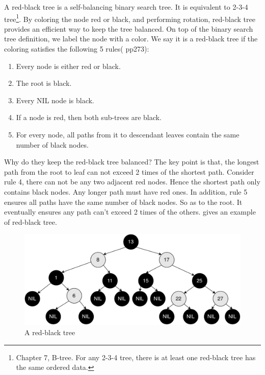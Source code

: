 \documentclass[b5paper]{article}
\begin{document}
A red-black tree is a self-balancing binary search tree\cite{wiki-rbt}. It is equivalent to 2-3-4 tree\footnote{Chapter 7, B-tree. For any 2-3-4 tree, there is at least one red-black tree has the same ordered data.}. By coloring the node red or black, and performing rotation, red-black tree provides an efficient way to keep the tree balanced. On top of the binary search tree definition, we label the node with a color. We say it is a red-black tree if the coloring satisfies the following 5 rules(\cite{CLRS} pp273):

\begin{enumerate}
\item Every node is either red or black.
\item The root is black.
\item Every NIL node is black.
\item If a node is red, then both sub-trees are black.
\item For every node, all paths from it to descendant leaves contain the same number of black nodes.
\end{enumerate}

Why do they keep the red-black tree balanced? The key point is that, the longest path from the root to leaf can not exceed 2 times of the shortest path. Consider rule 4, there can not be any two adjacent red nodes. Hence the shortest path only contains black nodes. Any longer path must have red ones. In addition, rule 5 ensures all paths have the same number of black nodes. So as to the root. It eventually ensures any path can't exceed 2 times of the others\cite{wiki-rbt}.  gives an example of red-black tree.

\begin{figure}[htbp]
  \centering
  \includegraphics[scale=0.5]{img/rbt-example-with-nil}
  \caption{A red-black tree}
  \label{fig:rbt-example-with-nil}
\end{figure}
\end{document}
